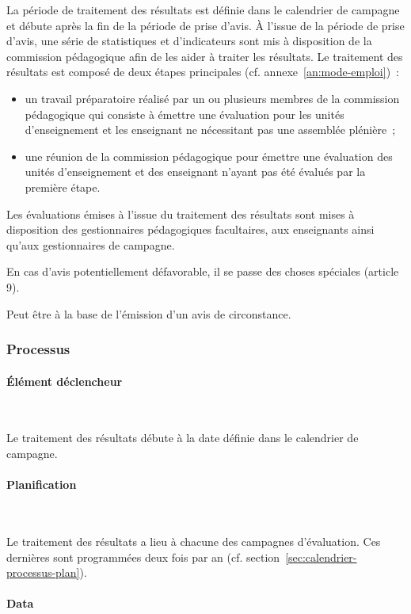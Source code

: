 \documentclass[a4paper,11pt]{report}
\begin{document}
La période de traitement des résultats est définie dans le calendrier de campagne et débute après la fin de la période de prise d'avis.
À l'issue de la période de prise d'avis, une série de statistiques et d'indicateurs sont mis à disposition de la commission pédagogique afin de les aider à traiter les résultats.
Le traitement des résultats est composé de deux étapes principales (cf. annexe~\ref{an:mode-emploi})~:
\begin{itemize}
	\item un travail préparatoire réalisé par un ou plusieurs membres de la commission pédagogique qui consiste à émettre une évaluation pour les unités d'enseignement et les enseignant ne nécessitant pas une assemblée plénière~;
	\item une réunion de la commission pédagogique pour émettre une évaluation des unités d'enseignement et des enseignant n'ayant pas été évalués par la première étape.
\end{itemize}

Les évaluations émises à l'issue du traitement des résultats sont mises à disposition des gestionnaires pédagogiques facultaires, aux enseignants ainsi qu'aux gestionnaires de campagne.

En cas d'avis potentiellement défavorable, il se passe des choses spéciales (article 9).

Peut être à la base de l'émission d'un avis de circonstance.


\subsubsection{Processus}
\paragraph{Élément déclencheur}~\newline{}

Le traitement des résultats débute à la date définie dans le calendrier de campagne.

\paragraph{Planification}~\newline{}

Le traitement des résultats a lieu à chacune des campagnes d'évaluation.
Ces dernières sont programmées deux fois par an (cf. section~\ref{sec:calendrier-processus-plan}).

\paragraph{Data}~\newline{}
\end{document}
